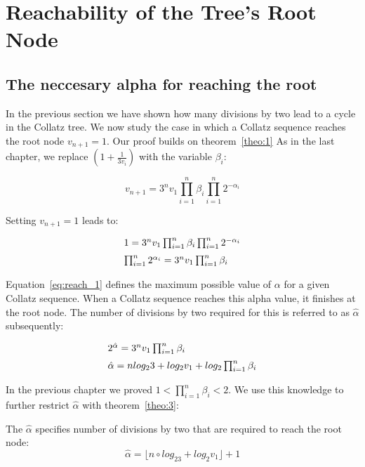 \chapter{Reachability of the Tree's Root Node}

\section{The neccesary alpha for reaching the root}
In the previous section we have shown how many divisions by two lead to a cycle in the Collatz tree. We now study the case in which a Collatz sequence reaches the root node $v_{n+1}=1$. Our proof builds on theorem~\ref{theo:1} As in the last chapter, we replace $(1+\frac{1}{3v_i})$ with the variable $\beta_i$:

\[
v_{n+1}=3^nv_1\prod_{i=1}^{n}\beta_i\prod_{i=1}^{n}2^{-\alpha_i}
\]

Setting $v_{n+1}=1$ leads to:

\begin{equation}
\label{eq:reach_1}
\begin{array}{l}
1=3^nv_1\prod_{i=1}^{n}\beta_i\prod_{i=1}^{n}2^{-\alpha_i}
\\[\medskipamount]
\prod_{i=1}^{n}2^{\alpha_i}=3^nv_1\prod_{i=1}^{n}\beta_i
\end{array}	
\end{equation}

\par\medskip
Equation~\ref{eq:reach_1} defines the maximum possible value of $\alpha$ for a given Collatz sequence. When a Collatz sequence reaches this alpha value, it finishes at the root node. The number of divisions by two required for this is referred to as $\hat\alpha$ subsequently:

\begin{equation*}
\begin{array}{l}
2^{\hat\alpha}=3^nv_1\prod_{i=1}^{n}\beta_i
\\[\medskipamount]
\hat\alpha=nlog_23+log_2v_1+log_2\prod_{i=1}^{n}\beta_i
\end{array}	
\end{equation*}

\par\medskip
In the previous chapter we proved $1<\prod_{i=1}^{n}\beta_i<2$. We use this knowledge to further restrict $\hat\alpha$ with theorem~\ref{theo:3}:

\bigskip
\begin{theorem}
\label{theo:3}
The $\hat\alpha$ specifies number of divisions by two that are required to reach the root node:
\[
\hat\alpha=\lfloor n\circ log_23+log_2v_1\rfloor+1
\]
\end{theorem}

